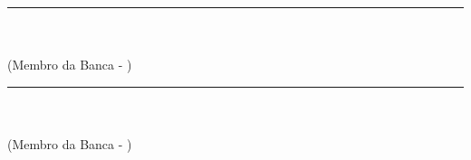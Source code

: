 \begin{folhadeaprovacao}
\begin{flushleft}
		\vspace*{1.45cm} %
		\rule{9 cm}{.1 mm}\\
		{\imprimirtitulacaoexamdois}{ }{\imprimirnomeexamdois}\\
		(Membro da Banca - {\imprimirinstexamdois})\\
				
		\vspace*{1.45cm} %
		\rule{9 cm}{.1 mm}\\
		\imprimirtitulacaoexamum{ }\imprimirnmexamum\\
		(Membro da Banca - \imprimirinstexamum)
				
		\vspace*{2cm} %
	\end{flushleft}

	\begin{center} %
		\normalsize %
		\setlength{\baselineskip}{1.2\baselineskip}
		\textbf{\imprimirlocal}\\
		\textbf{\imprimirdata}
	\end{center} %
	
\end{folhadeaprovacao}
\makeatother
